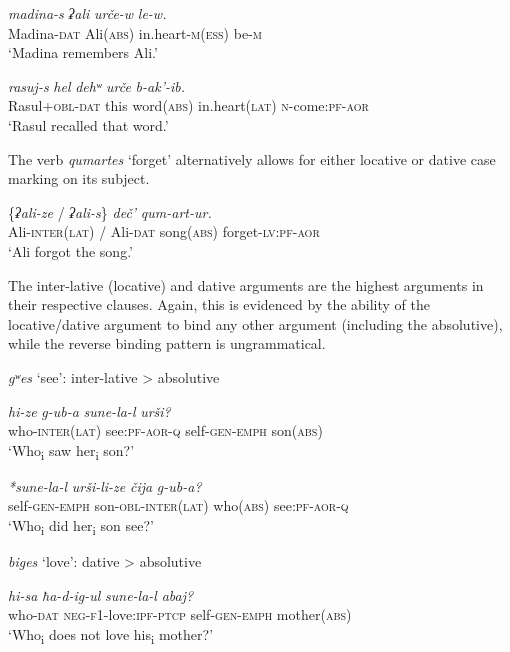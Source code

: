 ﻿\documentclass[output=paper]{langsci/langscibook}
\begin{document}
\ex %
\gll \emph{madina-s} \emph{ʡali} \emph{urče-w} \emph{le-w.}\\
Madina-\textsc{dat} Ali(\textsc{abs}) in.heart-\textsc{m(ess)} {be}-\textsc{m}\\
\glt `Madina remembers Ali.'

\ex %
\gll \emph{rasuj-s} \emph{hel} \emph{dehʷ} \emph{urče} \emph{b-ak'-ib.}\\
Rasul+\textsc{obl}-\textsc{dat} {this} word(\textsc{abs}) in.heart(\textsc{lat}) \textsc{n}-come:\textsc{pf}-\textsc{aor}\\
\glt `Rasul recalled that word.'
\z

The verb \emph{qumartes} `forget' alternatively allows
for either locative or dative case marking on its subject.

\ea \label{ex:7-29}
\gll \{\emph{ʡali-ze} / \emph{ʡali-s}\} \emph{deč'} \emph{qum-art-ur.}\\
Ali-\textsc{inter(lat)} / Ali-\textsc{dat} song(\textsc{abs}) forget-\textsc{lv}:\textsc{pf}-\textsc{aor}\\
\glt `Ali forgot the song.'
\z

The inter-lative (locative) and dative arguments are the highest
arguments in their respective clauses. Again, this is evidenced by the
ability of the locative/dative argument to bind any other argument
(including the absolutive), while the reverse binding pattern is
ungrammatical.

\ea %
\emph{gʷes} `see': inter-lative \textgreater{} absolutive

\ea %
\gll \emph{hi-ze} \emph{g-ub-a} \emph{sune-la-l} \emph{urši?}\\
who-\textsc{inter(lat)} see:\textsc{pf}-\textsc{aor}-\textsc{q} self-\textsc{gen}-\textsc{emph} son(\textsc{abs})\\
\glt `Who\textsubscript{i} saw her\textsubscript{i} son?'

\ex %
\gll \emph{*sune-la-l} \emph{urši-li-ze} \emph{čija} \emph{g-ub-a?}\\
self-\textsc{gen}-\textsc{emph} son-\textsc{obl}-\textsc{inter(lat)} who(\textsc{abs}) see:\textsc{pf}-\textsc{aor}-\textsc{q}\\
\glt `Who\textsubscript{i} did her\textsubscript{i} son see?'
\z

\ex %
\emph{biges} `love': dative \textgreater{} absolutive

\ea %
\gll \emph{hi-sa} \emph{ħa-d-ig-ul} \emph{sune-la-l} \emph{abaj?}\\
who-\textsc{dat} \textsc{neg}-\textsc{f1}-love:\textsc{ipf}-\textsc{ptcp} self-\textsc{gen}-\textsc{emph} mother(\textsc{abs})\\
\glt `Who\textsubscript{i} does not love his\textsubscript{i} mother?'
\end{document}
